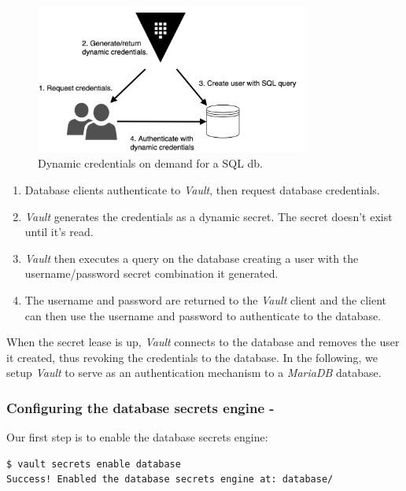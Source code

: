 \documentclass[runningheads]{llncs}
\begin{document}
\begin{figure}
    \centering
    \includegraphics[width=0.8\textwidth]{images/nsip_practical_db_secret_engine.png}
    \caption{Dynamic credentials on demand for a SQL db.}
    \label{practical_dynamic_secrets}
\end{figure}

\begin{enumerate}
    \setlength\itemsep{1mm}
    \item Database clients authenticate to \textit{Vault}, then request database credentials.
    \item \textit{Vault} generates the credentials as a dynamic secret. The secret doesn't exist until it's read.
    \item \textit{Vault} then executes a query on the database  creating a user with the username/password secret combination it generated.
    \item The username and password are returned to the \textit{Vault} client and the client can then use the username and password to authenticate to the database.
\end{enumerate}

When the secret lease is up, \textit{Vault} connects to the database and removes the user it created, thus revoking the credentials to the database. In the following, we setup \textit{Vault} to serve as an authentication mechanism to a \textit{MariaDB} database.

\subsubsection{Configuring the database secrets engine -} Our first step is to enable the database secrets engine: 

\begin{lstlisting}[language=bash]
$ vault secrets enable database
Success! Enabled the database secrets engine at: database/
\end{lstlisting}
\end{document}
